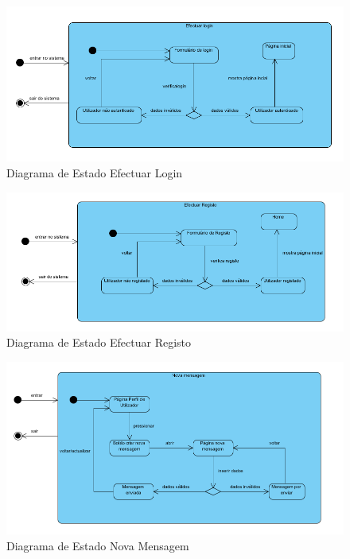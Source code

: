 ﻿\documentclass[12pt,a4paper]{article}
\begin{document}
\begin{figure}[h!]
\centering
\includegraphics[scale=0.7]{estado/login}
\caption{Diagrama de Estado Efectuar Login} 
\end{figure} 

\begin{figure}[h!]
\centering
\includegraphics[scale=0.7]{estado/registo}
\caption{Diagrama de Estado Efectuar Registo} 
\end{figure} 

\begin{figure}[h!]
\centering
\includegraphics[scale=0.7]{estado/novamensagem}
\caption{Diagrama de Estado Nova Mensagem} 
\end{figure} 
\end{document}
